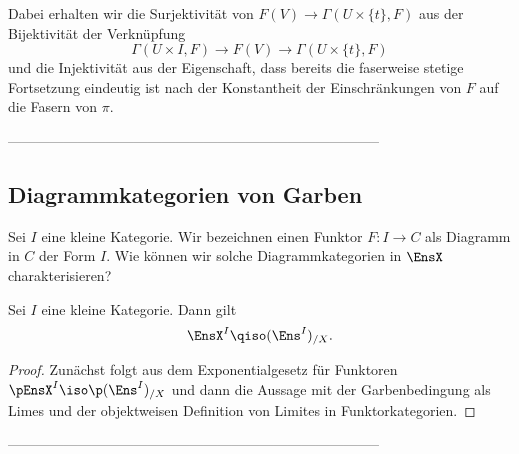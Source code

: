 Dabei erhalten wir die Surjektivität von
$F(V) \to \Gamma(U \times \{t\}, F)$ aus der Bijektivität der
Verknüpfung
\[ \Gamma(U \times I, F) \to F(V) \to \Gamma(U \times \{t\}, F) \]
und die Injektivität aus der Eigenschaft, dass bereits die faserweise
stetige Fortsetzung eindeutig ist nach der Konstantheit der
Einschränkungen von $F$ auf die Fasern von $\pi$.

--------------------------------------------------------------------------------


\subsection{Diagrammkategorien von Garben}

Sei $I$ eine kleine Kategorie. Wir bezeichnen einen Funktor $F: I \to
C$ als Diagramm in $C$ der Form $I$. Wie können wir solche
Diagrammkategorien in $\EnsX$ charakterisieren?

\begin{prop}
  Sei $I$ eine kleine Kategorie. Dann gilt
  \[ \EnsX^I \qiso (\Ens^I)_{/X}. \]
\end{prop}
\begin{proof}
  Zunächst folgt aus dem Exponentialgesetz für Funktoren
  $\pEnsX^I \iso \p (\Ens^I)_{/X}$ und dann die Aussage mit der
  Garbenbedingung als Limes und der objektweisen Definition von
  Limites in Funktorkategorien.
\end{proof}

--------------------------------------------------------------------------------



